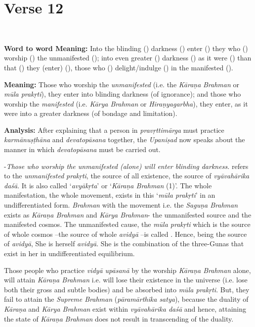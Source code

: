 \chapter{Verse 12}

\begin{moolashloka}
\\
\end{moolashloka}

\textbf{Word to word Meaning:} Into the blinding () darkness () enter () they who () worship () the unmanifested (); into even greater () darkness () as it were () than that () they (enter) (), those who () delight/indulge () in the manifested ().

\textbf{Meaning:} Those who worship the \emph{unmanifested} (i.e. the \emph{Kāraṇa} \emph{Brahman} or \emph{mūla prakṛti}), they enter into blinding darkness (of ignorance); and those who worship the \emph{manifested} (i.e. \emph{Kārya Brahman} or \emph{Hiraṇyagarbha}), they enter, as it were into a greater darkness (of bondage and limitation).

\textbf{Analysis:} After explaining that a person in \emph{pravṛttimārga} must practice \emph{karmānuṣṭhāna} and \emph{devatopāsana} together, the \emph{Upaniṣad} now speaks about the manner in which \emph{devatopāsana} must be carried out.

-\emph{Those who worship the unmanifested (alone) will enter blinding darkness.}  refers to the \emph{unmanifested} \emph{prakṛti}, the source of all existence, the source of \emph{vyāvahārika daśā}. It is also called `\emph{avyākṛta}' or `\emph{Kāraṇa Brahman} (1)'. The whole manifestation, the whole movement, exists in this `\emph{mūla prakṛti}' in an undifferentiated form. \emph{Brahman} with the movement i.e. the \emph{Saguṇa Brahman} exists as \emph{Kāraṇa Brahman} and \emph{Kārya Brahman}- the unmanifested source and the manifested cosmos. The unmanifested cause, the \emph{mūla prakṛti} which is the source of whole cosmos --the source of whole \emph{avidyā} --is called . Hence, being the source of \emph{avidyā}, She is herself \emph{avidyā}. She is the combination of the three-Gunas that exist in her in undifferentiated equilibrium.

Those people who practice \emph{vidyā upāsanā} by the worship \emph{Kāraṇa Brahman} alone, will attain \emph{Kāraṇa Brahman} i.e. will lose their existence in the universe (i.e. lose both their gross and subtle bodies) and be absorbed into \emph{mūla prakṛti}. But, they fail to attain the \emph{Supreme Brahman} (\emph{pāramārthika satya}), because the duality of \emph{Kāraṇa} and \emph{Kārya Brahman} exist within \emph{vyāvahārika daśā} and hence, attaining the state of \emph{Kāraṇa} \emph{Brahman} does not result in transcending of the duality.

